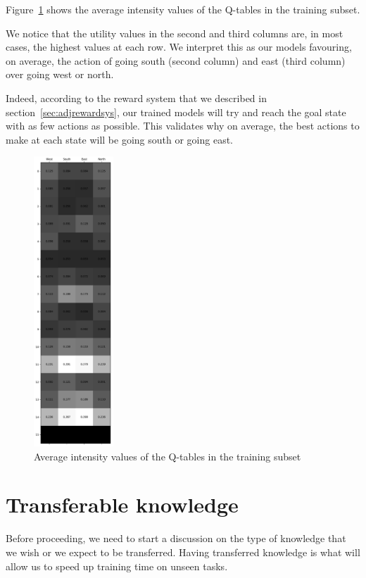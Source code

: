 Figure~\ref{fig:Qvalues} shows the average intensity values of the Q-tables in the training subset.

We notice that the utility values in the second and third columns are, in most cases, the highest values at each row. We interpret this as our models favouring, on average, the action of going south (second column) and east (third column) over going west or north.

Indeed, according to the reward system that we described in section~\ref{sec:adjrewardsys}, our trained models will try and reach the goal state with as few actions as possible. This validates why on average, the best actions to make at each state will be going south or going east.

\begin{figure}
\centering
\includegraphics[width=3cm]{Figures/Qtable_mean}
\caption{Average intensity values of the Q-tables in the training subset}
\label{fig:Qvalues}
\end{figure}

\section{Transferable knowledge}
\label{sec:transferableknowledge}
Before proceeding, we need to start a discussion on the type of knowledge that we wish or we expect to be transferred. Having transferred knowledge is what will allow us to speed up training time on unseen tasks.


